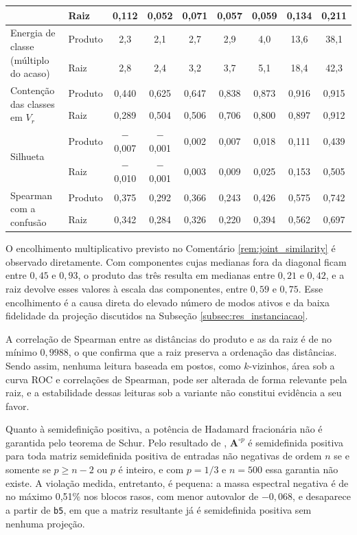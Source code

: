 \begin{table}[htbp]
{\begin{tabular}{llccccccc}
 & Raiz & 0,112 & 0,052 & 0,071 & 0,057 & 0,059 & 0,134 & 0,211 \\
\hline
\multirow{2}{*}{Energia de classe (múltiplo do acaso)} & Produto & 2,3 & 2,1 & 2,7 & 2,9 & 4,0 & 13,6 & 38,1 \\
 & Raiz & 2,8 & 2,4 & 3,2 & 3,7 & 5,1 & 18,4 & 42,3 \\
\hline
\multirow{2}{*}{Contenção das classes em $V_r$} & Produto & 0,440 & 0,625 & 0,647 & 0,838 & 0,873 & 0,916 & 0,915 \\
 & Raiz & 0,289 & 0,504 & 0,506 & 0,706 & 0,800 & 0,897 & 0,912 \\
\hline
\multirow{2}{*}{Silhueta} & Produto & $-$0,007 & $-$0,001 & 0,002 & 0,007 & 0,018 & 0,111 & 0,439 \\
 & Raiz & $-$0,010 & $-$0,001 & 0,003 & 0,009 & 0,025 & 0,153 & 0,505 \\
\hline
\multirow{2}{*}{Spearman com a confusão} & Produto & 0,375 & 0,292 & 0,366 & 0,243 & 0,426 & 0,575 & 0,742 \\
 & Raiz & 0,342 & 0,284 & 0,326 & 0,220 & 0,394 & 0,562 & 0,697 \\
\hline
\end{tabular}}
\end{table}

O encolhimento multiplicativo previsto no Comentário \ref{rem:joint_similarity} é observado diretamente. Com componentes cujas medianas fora da diagonal ficam entre $0{,}45$ e $0{,}93$, o produto das três resulta em medianas entre $0{,}21$ e $0{,}42$, e a raiz devolve esses valores à escala das componentes, entre $0{,}59$ e $0{,}75$. Esse encolhimento é a causa direta do elevado número de modos ativos e da baixa fidelidade da projeção discutidos na Subseção \ref{subsec:res_instanciacao}.

A correlação de Spearman entre as distâncias do produto e as da raiz é de no mínimo $0{,}9988$, o que confirma que a raiz preserva a ordenação das distâncias. Sendo assim, nenhuma leitura baseada em postos, como $k$-vizinhos, área sob a curva ROC e correlações de Spearman, pode ser alterada de forma relevante pela raiz, e a estabilidade dessas leituras sob a variante não constitui evidência a seu favor.

Quanto à semidefinição positiva, a potência de Hadamard fracionária não é garantida pelo teorema de Schur. Pelo resultado de \citet{FitzGeraldHorn1977}, $\mathbf{A}^{\circ p}$ é semidefinida positiva para toda matriz semidefinida positiva de entradas não negativas de ordem $n$ se e somente se $p \geq n-2$ ou $p$ é inteiro, e com $p = 1/3$ e $n = 500$ essa garantia não existe. A violação medida, entretanto, é pequena: a massa espectral negativa é de no máximo 0,51\% nos blocos rasos, com menor autovalor de $-0{,}068$, e desaparece a partir de \texttt{b5}, em que a matriz resultante já é semidefinida positiva sem nenhuma projeção.

